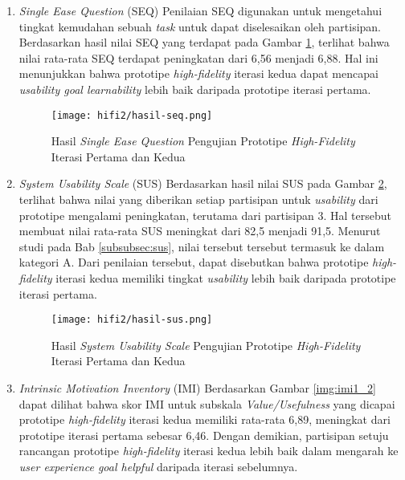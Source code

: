 
\begin{enumerate}
  \item \textit{Single Ease Question} (SEQ)
  \subitem  Penilaian SEQ digunakan untuk mengetahui tingkat kemudahan sebuah \textit{task} untuk dapat diselesaikan oleh partisipan. Berdasarkan hasil nilai SEQ yang terdapat pada Gambar \ref{img:seq_2}, terlihat bahwa nilai rata-rata SEQ terdapat peningkatan dari 6,56 menjadi 6,88. Hal ini menunjukkan bahwa prototipe \textit{high-fidelity} iterasi kedua dapat mencapai \textit{usability goal learnability} lebih baik daripada prototipe iterasi pertama. 

  \begin{figure}[h]
    \centering
    \texttt{[image: hifi2/hasil-seq.png]}
    \caption{Hasil \textit{Single Ease Question} Pengujian Prototipe \textit{High-Fidelity} Iterasi Pertama dan Kedua}
    \label{img:seq_2}
  \end{figure}
  \FloatBarrier

  \item \textit{System Usability Scale} (SUS)
  \subitem  Berdasarkan hasil nilai SUS pada Gambar \ref{img:sus_2}, terlihat bahwa nilai yang diberikan setiap partisipan untuk \textit{usability} dari prototipe mengalami peningkatan, terutama dari partisipan 3. Hal tersebut membuat nilai rata-rata SUS meningkat dari 82,5 menjadi 91,5. Menurut studi pada Bab \ref{subsubsec:sus}, nilai tersebut tersebut termasuk ke dalam kategori A. Dari penilaian tersebut, dapat disebutkan bahwa prototipe \textit{high-fidelity} iterasi kedua memiliki tingkat \textit{usability} lebih baik daripada prototipe iterasi pertama.

  \begin{figure}[h]
    \centering
    \texttt{[image: hifi2/hasil-sus.png]}
    \caption{Hasil \textit{System Usability Scale} Pengujian Prototipe \textit{High-Fidelity} Iterasi Pertama dan Kedua}
    \label{img:sus_2}
  \end{figure}
  \FloatBarrier

  \item \textit{Intrinsic Motivation Inventory} (IMI)
  \subitem  Berdasarkan Gambar \ref{img:imi1_2} dapat dilihat bahwa skor IMI untuk subskala \textit{Value/Usefulness} yang dicapai prototipe \textit{high-fidelity} iterasi kedua memiliki rata-rata 6,89, meningkat dari prototipe iterasi pertama sebesar 6,46. Dengan demikian, partisipan setuju rancangan prototipe \textit{high-fidelity} iterasi kedua lebih baik dalam mengarah ke \textit{user experience goal helpful} daripada iterasi sebelumnya.
  

\end{enumerate}
